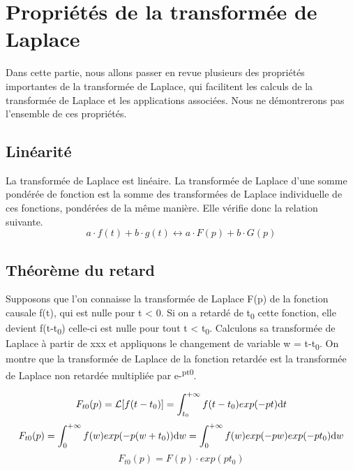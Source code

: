 \documentclass[]{book}
\begin{document}
{	\section{Propriétés de la transformée de Laplace}
	Dans cette partie, nous allons passer en revue plusieurs des propriétés importantes de la transformée de Laplace, qui facilitent les calculs de la transformée de Laplace et les applications associées. Nous ne démontrerons pas l'ensemble de ces propriétés.
	\subsection{Linéarité}
	La transformée de Laplace est linéaire. La transformée de Laplace d'une somme pondérée de fonction est la somme des transformées de Laplace individuelle de ces fonctions, pondérées de la même manière. Elle vérifie donc la relation suivante.
	\begin{equation}\label{key}
	a \cdot f(t)+b \cdot g(t) \longleftrightarrow a \cdot F(p)+b \cdot G(p)
	\end{equation}
	
	\subsection{Théorème du retard}
	
	Supposons que l'on connaisse la transformée de Laplace F(p) de la
	fonction causale f(t), qui est nulle pour t \textless{} 0. Si on a
	retardé de t\textsubscript{0} cette fonction, elle devient
	f(t-t\textsubscript{0}) celle-ci est nulle pour tout t \textless{}
	t\textsubscript{0}. Calculons sa transformée de Laplace à partir de xxx
	et appliquons le changement de variable w = t-t\textsubscript{0}. On
	montre que la transformée de Laplace de la fonction retardée est la
	transformée de Laplace non retardée multipliée par
	e-\textsuperscript{pt0}.
	
	\begin{equation*}
	F_{t0}(p) = \mathcal{L}[f(t-t_{0})]=\int_{t_{0}}^{+\infty}f(t-t_{0})exp(-pt) \mathrm{d} t   
	\end{equation*}
	\begin{equation*}
	F_{t0}(p) = \int_{0}^{+\infty}f(w)exp(-p(w+t_{0})) \mathrm{d} w = \int_{0}^{+\infty}f(w)exp(-pw)exp(-pt_{0}) \mathrm{d} w  
	\end{equation*}
	\begin{equation}\label{}
	F_{t0}(p) = F(p)\cdot exp(pt_{0})
	\end{equation}
	
}
\end{document}
